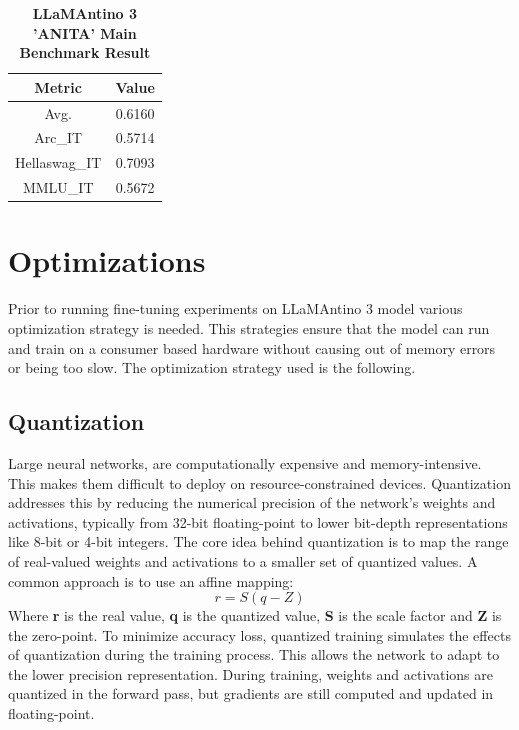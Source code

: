 \documentclass{article}
\begin{document}
	\begin{table}[h]
		\center
		\begin{tabular}{cc}
			\toprule
			\textbf{Metric} & \textbf{Value} \\
			\midrule
			Avg. & 0.6160 \\
			Arc\_IT & 0.5714 \\
			Hellaswag\_IT &	0.7093 \\
			MMLU\_IT & 0.5672 \\
			\bottomrule
		\end{tabular}
		\caption{\textbf{LLaMAntino 3 'ANITA' Main Benchmark Result}}
	\end{table}  

	\section{Optimizations}
	Prior to running fine-tuning experiments on LLaMAntino 3 model various optimization strategy is needed. This strategies ensure that the model can run and train on a consumer based hardware without causing out of memory errors or being too slow. 
	The optimization strategy used is the following.
	
	\subsection{Quantization}  
	Large neural networks, are computationally expensive and memory-intensive. This makes them difficult to deploy on resource-constrained devices. Quantization addresses this by reducing the numerical precision of the network's weights and activations, typically from 32-bit floating-point to lower bit-depth representations like 8-bit or 4-bit integers. The core idea behind quantization is to map the range of real-valued weights and activations to a smaller set of quantized values. A common approach is to use an affine mapping:
	\begin{equation}
		r=S(q-Z)
	\end{equation}
	Where \textbf{r} is the real value, \textbf{q} is the quantized value, \textbf{S} is the scale factor and \textbf{Z} is the zero-point. To minimize accuracy loss, quantized training simulates the effects of quantization during the training process. This allows the network to adapt to the lower precision representation. During training, weights and activations are quantized in the forward pass, but gradients are still computed and updated in floating-point.
	
	
\end{document}
